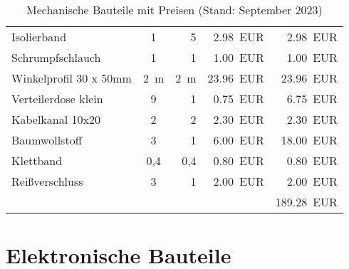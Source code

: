 \documentclass[./00PhotoBox.tex]{subfiles}
\begin{document}
\begin{table}[ht]
\begin{tabular}{l|c|r|r|r}
        Isolierband                   & 1                & 5                & \SI{2,98}{EUR}       & \SI{2,98}{EUR}   \\
        Schrumpfschlauch              & 1                & 1                & \SI{1,00}{EUR}       & \SI{1,00}{EUR}   \\
        Winkelprofil 30 x 50mm        & \SI{2}{\metre}   & \SI{2}{\metre}   & \SI{23,96}{EUR}      & \SI{23,96}{EUR}  \\
        Verteilerdose klein           & 9                & 1                & \SI{0,75}{EUR}       & \SI{6,75}{EUR}   \\
        Kabelkanal 10x20              & 2                & 2                & \SI{2,30}{EUR}       & \SI{2,30}{EUR}   \\
        Baumwollstoff                 & 3                & 1                & \SI{6,00}{EUR}       & \SI{18,00}{EUR}  \\
        Klettband                     & 0,4              & 0,4              & \SI{0,80}{EUR}       & \SI{0,80}{EUR}   \\
        Reißverschluss                & 3                & 1                & \SI{2,00}{EUR}       & \SI{2,00}{EUR}   \\
                                      &                  &                  &                      & \SI{189,28}{EUR} \\
    \end{tabular}
    \caption{Mechanische Bauteile mit Preisen (Stand: September 2023)}
    \label{tab:bauteile_mechanisch}
\end{table}

\clearpage

\section{Elektronische Bauteile}
\end{document}
